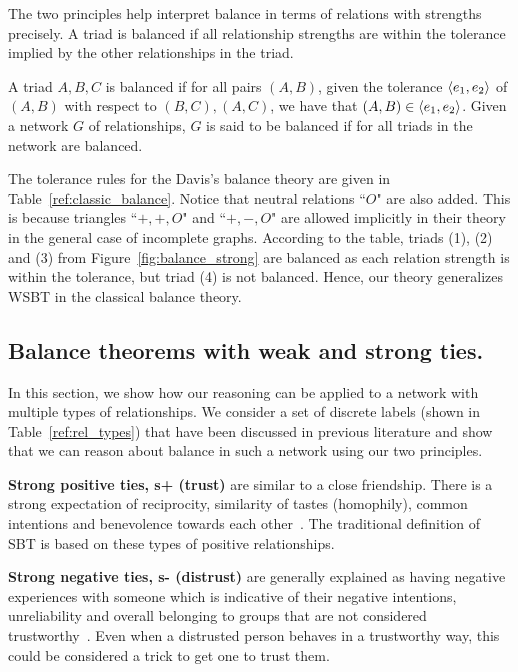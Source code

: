 The two principles help interpret balance in terms of relations with
strengths precisely. A triad is balanced if all relationship strengths
are within the tolerance implied by the other relationships in the
triad.

\begin{definition} [Balance]
A triad $A,B,C$ is balanced if for all pairs $(A,B)$, given the
tolerance $\langle e_1,e_2\rangle$ of $(A,B)$ with respect to $(B,C),(A,C)$,
we have that $(A,B)\in \langle e_1,e_2\rangle$. 
Given a network $G$ of relationships, $G$ is said to be balanced if
for all triads in the network are balanced.
\end{definition}

The tolerance rules for the Davis's balance theory are
given in Table~\ref{ref:classic_balance}. Notice that neutral
relations ``$O$" are also added. This is because triangles ``$+, +,
O$" and ``$+, -, O$" are allowed implicitly in their theory in the
general case of incomplete graphs. According to the table, triads (1), (2) and
(3) from Figure~\ref{fig:balance_strong} are balanced as each relation
strength is within the tolerance, but triad (4) is not
balanced. Hence, our theory generalizes WSBT in the
classical balance theory.

\subsection{Balance theorems with weak and strong ties.} \label{sec:weak_strong}
In this section, we show how our reasoning can be applied to a network
with multiple types of relationships. We consider a set of discrete
labels (shown in Table~\ref{ref:rel_types}) that have been discussed
in previous literature and show that we can reason about balance in
such a network using our two principles. 

{\bf Strong positive ties, s+ (trust)} are similar to a close
friendship. There is a strong expectation of reciprocity, similarity
of tastes (homophily), common intentions and benevolence towards each
other~\cite{Tomasello:2005}. The traditional definition of SBT is
based on these types of positive relationships.

{\bf Strong negative ties, s- (distrust)} are generally explained as
having negative experiences with someone which is indicative of their
negative intentions, unreliability and overall belonging to groups
that are not considered trustworthy~\cite{Fiske:2007}. Even when a
distrusted person behaves in a trustworthy way, this could be
considered a trick to get one to trust them.

